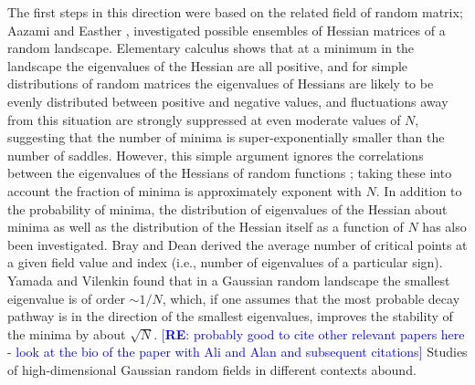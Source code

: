 \documentclass[12pt]{article}
\newcommand{\re}[1]{\textcolor{blue}{[{\bf RE}: #1]}}
\begin{document}
 The first steps in this direction were based on the related field of random matrix; Aazami and Easther \cite{Aazami2006}, investigated possible ensembles of Hessian matrices of a random landscape.  Elementary calculus shows that at a minimum in the landscape the eigenvalues of the Hessian are all positive, and for simple distributions of random matrices the eigenvalues of Hessians are likely to be evenly distributed between positive and negative values, and fluctuations away from this situation are strongly suppressed at even moderate values of $N$, suggesting that the number of minima is super-exponentially smaller than the number of saddles. However, this simple argument ignores the correlations between the eigenvalues of the Hessians of random functions \cite{Easther2016}; taking these into account the fraction of minima is approximately exponent with $N$.  In addition to the probability of minima, the distribution of eigenvalues of the Hessian about minima as well as the distribution of the Hessian itself as a function of $N$ has also been investigated.\cite{Bray2007}\cite{Yamada2018} Bray and Dean derived the average number of critical points at a given field value and index (i.e., number of eigenvalues of a particular sign). Yamada and Vilenkin found that in a Gaussian random landscape the smallest eigenvalue is of order $\sim 1/N$, which, if one assumes that the most probable decay pathway is in the direction of the smallest eigenvalues, improves the stability of the minima by about $\sqrt{N}$. \re{probably good to cite other relevant papers here - look at the bio of the paper with Ali and Alan and subsequent citations} Studies of high-dimensional Gaussian random fields in different contexts abound.\cite{Dean2008}\cite{Majumdar2009}\cite{Bachlechner2014}\cite{Battefeld2012}\cite{Fyodorov2013}\cite{Masoumi2017}

\end{document}
